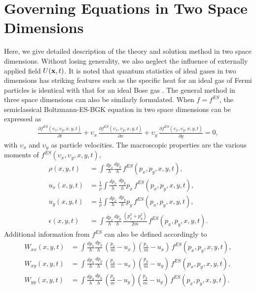 \documentclass{rsproca}%
\begin{document}
\section{Governing Equations in Two Space Dimensions}
\label{sec:3}
Here, we give detailed description of the theory and solution method in two space dimensions.  Without losing generality, we also neglect the influence of externally applied field \(U({\bf x},t)\).  It is noted that quantum statistics of ideal gases in two dimensions has striking features such as the specific heat for an ideal gas of Fermi particles is identical with that for an ideal Bose gas \cite{May1964}. The general method in three space dimensions can also be similarly formulated.   When $f=f^{ES}$, the semiclassical Boltzmann-ES-BGK equation in two space dimensions can be expressed as
\begin{align}
\frac{\partial f^{ES}({\upsilon}_x,{\upsilon}_y, x, y, t)}{\partial t} + {\upsilon}_x\,\frac{\partial f^{ES}({\upsilon}_x,{\upsilon}_y, x, y, t)}{\partial x } + {\upsilon}_y\,\frac{\partial f^{ES}({\upsilon}_x,{\upsilon}_y, x, y, t)} {\partial y} =0, \label{normalizedes}
\end{align}
with ${\upsilon}_x$ and ${\upsilon}_y$ as particle velocities.   The macroscopic properties are the various moments of $f^{ES}({\upsilon}_x,{\upsilon}_y,x,y,t)$,
\begin{subequations}
\begin{align}
\rho (x,y,t) 			&= \int \frac{ d p_x}{h} \frac{ d p_y}{h} \, f^{ES}(p_x, p_y, x, y, t), \\
u_x (x,y,t) 			&= \frac{1}{\rho} \int 	 \frac{ d p_x}{h} \, \frac{ d p_y}{h}  p_x \, f^{ES}(p_x, p_y, x, y, t), \\
u_y (x,y,t) 			&= \frac{1}{\rho} \int 	 \frac{ d p_x}{h} \, \frac{ d p_y}{h}  p_y \, f^{ES}(p_x, p_y, x, y, t), \\
\epsilon (x,y,t) 	&= \int \frac{ d p_x}{h} \frac{ d p_y}{h} \, \frac{(p_x^2 + p_y^2)}{2m} \, f^{ES}(p_x, p_y, x, y, t).
\end{align}
\end{subequations}
Additional information from $f^{ES}$ can also be defined accordingly to
\begin{subequations}
\begin{align}
W_{x x}(x,y,t)	&=	\int \frac{ d p_x}{h} \frac{ d p_y}{h} \, (\frac{p_x}{m}-u_x)(\frac{p_x}{m}-u_x)\,f^{ES}(p_x, p_y, x, y, t), \\
W_{x y}(x,y,t)	&=	\int \frac{ d p_x}{h} \frac{ d p_y}{h} \, (\frac{p_x}{m}-u_x)(\frac{p_y}{m}-u_y)\,f^{ES}(p_x, p_y, x, y, t), \\
W_{y y}(x,y,t)	&=	\int \frac{ d p_x}{h} \frac{ d p_y}{h} \, (\frac{p_y}{m}-u_y)(\frac{p_y}{m}-u_y)\,f^{ES}(p_x, p_y, x, y, t).
\end{align}
\end{subequations}
\end{document}
